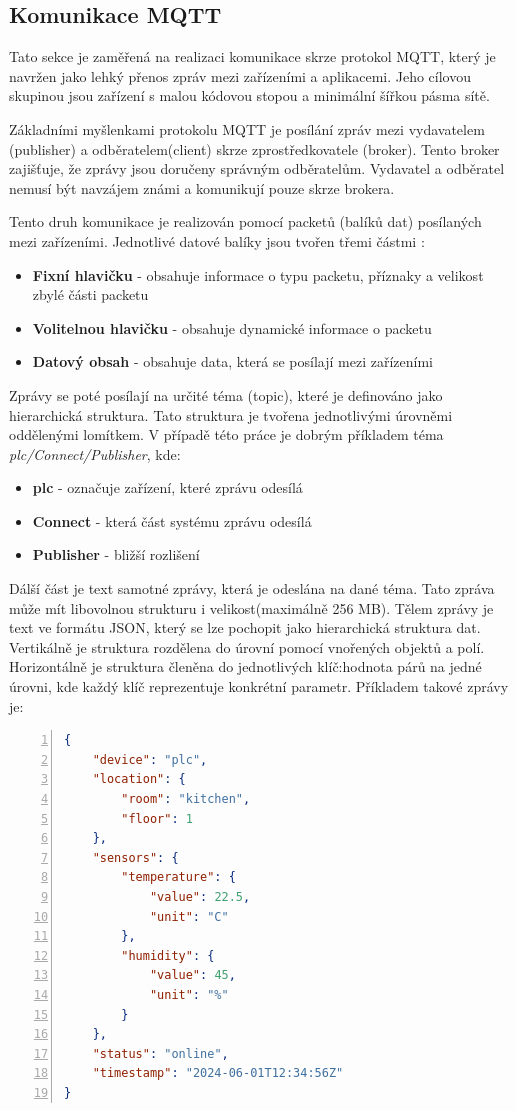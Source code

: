 \subsection{Komunikace MQTT}
Tato sekce je zaměřená na realizaci komunikace skrze protokol MQTT, který je navržen jako lehký přenos zpráv mezi zařízeními a aplikacemi. Jeho cílovou skupinou jsou zařízení s malou kódovou stopou a minimální šířkou pásma sítě. \cite{MQTT}

Základními myšlenkami protokolu MQTT je posílání zpráv mezi vydavatelem (publisher) a odběratelem(client) skrze zprostředkovatele (broker). Tento broker zajišťuje, že zprávy jsou doručeny správným odběratelům. Vydavatel a odběratel nemusí být navzájem známi a komunikují pouze skrze brokera. \cite{MQTT}

Tento druh komunikace je realizován pomocí packetů (balíků dat) posílaných mezi zařízeními. Jednotlivé datové balíky jsou tvořen třemi částmi \cite{MQTTEsentials}:
\begin{itemize}
    \item \textbf{Fixní hlavičku} - obsahuje informace o typu packetu, příznaky a velikost zbylé části packetu 
    \item \textbf{Volitelnou hlavičku} - obsahuje dynamické informace o packetu
    \item \textbf{Datový obsah} - obsahuje data, která se posílají mezi zařízeními \newline
\end{itemize}
Zprávy se poté posílají na určité téma (topic), které je definováno jako hierarchická struktura. Tato struktura je tvořena jednotlivými úrovněmi oddělenými lomítkem. V případě této práce je dobrým příkladem téma \textit{plc/Connect/Publisher}, kde:
\begin{itemize}
    \item \textbf{plc} - označuje zařízení, které zprávu odesílá
    \item \textbf{Connect} - která část systému zprávu odesílá
    \item \textbf{Publisher} - bližší rozlišení \newline
\end{itemize}
Dálší část je text samotné zprávy, která je odeslána na dané téma. Tato zpráva může mít libovolnou strukturu i velikost(maximálně 256 MB). Tělem zprávy je text ve formátu JSON, který se lze pochopit jako hierarchická struktura dat. Vertikálně je struktura rozdělena do úrovní pomocí vnořených objektů a polí. Horizontálně je struktura členěna do jednotlivých klíč:hodnota párů na jedné úrovni, kde každý klíč reprezentuje konkrétní parametr. Příkladem takové zprávy je:
\begin{lstlisting}[language=JSON, breaklines=true, numbers=left, numberstyle=\small, numbersep=10pt, frame=single, basicstyle=\ttfamily\small, caption={Příklad zprávy v JSON}, label={lst:json}]
{
    "device": "plc",
    "location": {
        "room": "kitchen",
        "floor": 1
    },
    "sensors": {
        "temperature": {
            "value": 22.5,
            "unit": "C"
        },
        "humidity": {
            "value": 45,
            "unit": "%"
        }
    },
    "status": "online",
    "timestamp": "2024-06-01T12:34:56Z"
}
\end{lstlisting}

